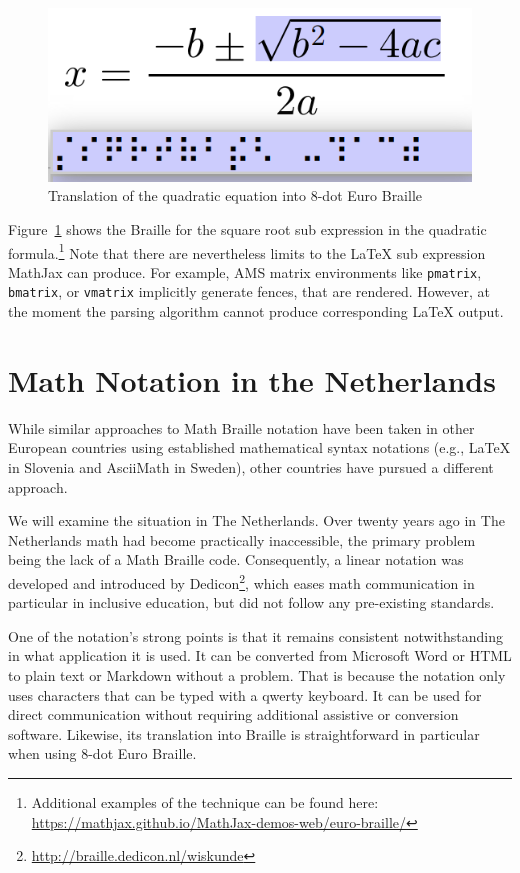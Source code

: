 \documentclass{easychair}
\begin{document}
\begin{figure}
  \includegraphics[width=.6\textwidth]{quadratic-square.png}
  \caption{Translation of the quadratic equation into 8-dot Euro Braille}
  \label{fig:subbraille}
\end{figure}

Figure~\ref{fig:subbraille} shows the Braille for the square root sub expression
in the quadratic formula.\footnote{Additional examples of the technique can be found
here: \url{https://mathjax.github.io/MathJax-demos-web/euro-braille/}} Note that
there are nevertheless limits to the {\LaTeX} sub expression MathJax can
produce. For example, AMS matrix environments like \texttt{pmatrix},
\texttt{bmatrix}, or \texttt{vmatrix} implicitly generate fences, that are
rendered. However, at the moment the parsing algorithm cannot produce
corresponding {\LaTeX} output.

\section{Math Notation in the Netherlands}\label{sec:math-netherlands}

While similar approaches to Math Braille notation have been taken in other
European countries using established mathematical syntax notations (e.g.,
{\LaTeX} in Slovenia and AsciiMath in Sweden), other countries have pursued a
different approach.

We will examine the situation in The Netherlands. Over twenty years ago in The
Netherlands math had become practically inaccessible, the primary problem being
the lack of a Math Braille code. Consequently, a linear notation was developed
and introduced by Dedicon\footnote{\url{http://braille.dedicon.nl/wiskunde}}, which eases
math communication in particular in inclusive education, but did not follow any
pre-existing standards.

One of the notation's strong points is that it remains consistent
notwithstanding in what application it is used. It can be converted from
Microsoft Word or HTML to plain text or Markdown without a problem. That is
because the notation only uses characters that can be typed with a qwerty
keyboard. It can be used for direct communication without requiring additional
assistive or conversion software. Likewise, its translation into Braille is
straightforward in particular when using 8-dot Euro Braille.
\end{document}

